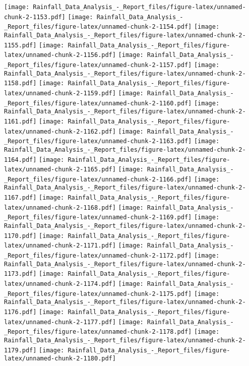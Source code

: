 \documentclass[
]{article}
\begin{document}
\texttt{[image: Rainfall\_Data\_Analysis\_-\_Report\_files/figure-latex/unnamed-chunk-2-1153.pdf]}
\texttt{[image: Rainfall\_Data\_Analysis\_-\_Report\_files/figure-latex/unnamed-chunk-2-1154.pdf]}
\texttt{[image: Rainfall\_Data\_Analysis\_-\_Report\_files/figure-latex/unnamed-chunk-2-1155.pdf]}
\texttt{[image: Rainfall\_Data\_Analysis\_-\_Report\_files/figure-latex/unnamed-chunk-2-1156.pdf]}
\texttt{[image: Rainfall\_Data\_Analysis\_-\_Report\_files/figure-latex/unnamed-chunk-2-1157.pdf]}
\texttt{[image: Rainfall\_Data\_Analysis\_-\_Report\_files/figure-latex/unnamed-chunk-2-1158.pdf]}
\texttt{[image: Rainfall\_Data\_Analysis\_-\_Report\_files/figure-latex/unnamed-chunk-2-1159.pdf]}
\texttt{[image: Rainfall\_Data\_Analysis\_-\_Report\_files/figure-latex/unnamed-chunk-2-1160.pdf]}
\texttt{[image: Rainfall\_Data\_Analysis\_-\_Report\_files/figure-latex/unnamed-chunk-2-1161.pdf]}
\texttt{[image: Rainfall\_Data\_Analysis\_-\_Report\_files/figure-latex/unnamed-chunk-2-1162.pdf]}
\texttt{[image: Rainfall\_Data\_Analysis\_-\_Report\_files/figure-latex/unnamed-chunk-2-1163.pdf]}
\texttt{[image: Rainfall\_Data\_Analysis\_-\_Report\_files/figure-latex/unnamed-chunk-2-1164.pdf]}
\texttt{[image: Rainfall\_Data\_Analysis\_-\_Report\_files/figure-latex/unnamed-chunk-2-1165.pdf]}
\texttt{[image: Rainfall\_Data\_Analysis\_-\_Report\_files/figure-latex/unnamed-chunk-2-1166.pdf]}
\texttt{[image: Rainfall\_Data\_Analysis\_-\_Report\_files/figure-latex/unnamed-chunk-2-1167.pdf]}
\texttt{[image: Rainfall\_Data\_Analysis\_-\_Report\_files/figure-latex/unnamed-chunk-2-1168.pdf]}
\texttt{[image: Rainfall\_Data\_Analysis\_-\_Report\_files/figure-latex/unnamed-chunk-2-1169.pdf]}
\texttt{[image: Rainfall\_Data\_Analysis\_-\_Report\_files/figure-latex/unnamed-chunk-2-1170.pdf]}
\texttt{[image: Rainfall\_Data\_Analysis\_-\_Report\_files/figure-latex/unnamed-chunk-2-1171.pdf]}
\texttt{[image: Rainfall\_Data\_Analysis\_-\_Report\_files/figure-latex/unnamed-chunk-2-1172.pdf]}
\texttt{[image: Rainfall\_Data\_Analysis\_-\_Report\_files/figure-latex/unnamed-chunk-2-1173.pdf]}
\texttt{[image: Rainfall\_Data\_Analysis\_-\_Report\_files/figure-latex/unnamed-chunk-2-1174.pdf]}
\texttt{[image: Rainfall\_Data\_Analysis\_-\_Report\_files/figure-latex/unnamed-chunk-2-1175.pdf]}
\texttt{[image: Rainfall\_Data\_Analysis\_-\_Report\_files/figure-latex/unnamed-chunk-2-1176.pdf]}
\texttt{[image: Rainfall\_Data\_Analysis\_-\_Report\_files/figure-latex/unnamed-chunk-2-1177.pdf]}
\texttt{[image: Rainfall\_Data\_Analysis\_-\_Report\_files/figure-latex/unnamed-chunk-2-1178.pdf]}
\texttt{[image: Rainfall\_Data\_Analysis\_-\_Report\_files/figure-latex/unnamed-chunk-2-1179.pdf]}
\texttt{[image: Rainfall\_Data\_Analysis\_-\_Report\_files/figure-latex/unnamed-chunk-2-1180.pdf]}
\end{document}

